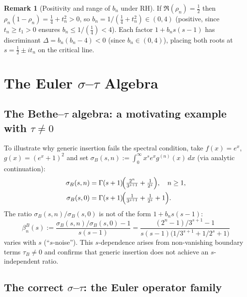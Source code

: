 \documentclass[12pt]{article}
\theoremstyle{plain}
\theoremstyle{definition}
\newtheorem{remark}[theorem]{Remark}
\begin{document}
\begin{remark}[Positivity and range of $b_n$ under RH]
If $\Re(\rho_n)=\tfrac12$ then $\rho_n(1-\rho_n)=\tfrac14+t_n^2>0$, so
$b_n=1/(\tfrac14+t_n^2)\in(0,4)$ (positive, since $t_n\ge t_1>0$ ensures
$b_n\le1/(\tfrac14)<4$).
Each factor $1+b_n s(s-1)$ has discriminant $\Delta=b_n(b_n-4)<0$
(since $b_n\in(0,4)$), placing both roots at $s=\tfrac12\pm it_n$
on the critical line.
\end{remark}



\section{The Euler $\sigma$--$\tau$ Algebra}\label{sec:IBP}

\subsection{The Bethe--$\tau$ algebra: a motivating example with $\tau\ne0$}
\label{sec:bethe_tau}

To illustrate why generic insertion fails the spectral condition, take
$f(x)=e^x$, $g(x)=(e^x+1)^2$ and set
$\sigma_B(s,n):=\int_0^\infty x^s e^x g^{(n)}(x)\,dx$ (via analytic continuation):
\begin{align}
  \sigma_B(s,n) &= \Gamma(s+1)\!\Bigl(\tfrac{2^n}{3^{s+1}}+\tfrac{1}{2^s}\Bigr), \quad n\ge1,
  \label{eq:bt_sigma_n}\\
  \sigma_B(s,0) &= \Gamma(s+1)\!\Bigl(\tfrac{1}{3^{s+1}}+\tfrac{1}{2^s}+1\Bigr).
  \label{eq:bt_sigma_0}
\end{align}
The ratio $\sigma_B(s,n)/\sigma_B(s,0)$ is not of the form $1+b_n s(s-1)$:
\begin{equation}\label{eq:bt_beta}
  \beta_n^B(s) := \frac{\sigma_B(s,n)/\sigma_B(s,0)-1}{s(s-1)}
  = \frac{(2^n-1)/3^{s+1}-1}{s(s-1)\bigl(1/3^{s+1}+1/2^s+1\bigr)}
\end{equation}
varies with $s$ (``$s$-noise'').
This $s$-dependence arises from non-vanishing boundary terms $\tau_B\ne0$
and confirms that generic insertion does not achieve an $s$-independent ratio.

\subsection{The correct $\sigma$--$\tau$: the Euler operator family}
\label{sec:euler_sigma}
\end{document}
